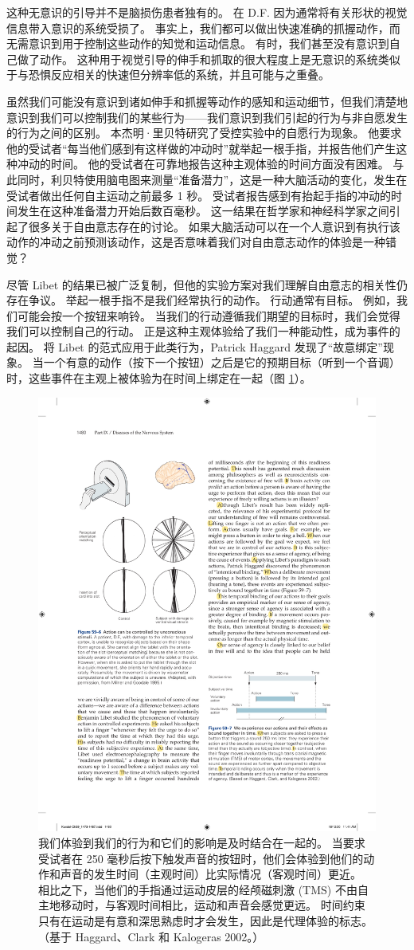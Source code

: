 这种无意识的引导并不是脑损伤患者独有的。 在 D.F. 因为通常将有关形状的视觉信息带入意识的系统受损了。 事实上，我们都可以做出快速准确的抓握动作，而无需意识到用于控制这些动作的知觉和运动信息。 有时，我们甚至没有意识到自己做了动作。 这种用于视觉引导的伸手和抓取的很大程度上是无意识的系统类似于与恐惧反应相关的快速但分辨率低的系统，并且可能与之重叠。

虽然我们可能没有意识到诸如伸手和抓握等动作的感知和运动细节，但我们清楚地意识到我们可以控制我们的某些行为——我们意识到我们引起的行为与非自愿发生的行为之间的区别。 本杰明·里贝特研究了受控实验中的自愿行为现象。 他要求他的受试者“每当他们感到有这样做的冲动时”就举起一根手指，并报告他们产生这种冲动的时间。 他的受试者在可靠地报告这种主观体验的时间方面没有困难。 与此同时，利贝特使用脑电图来测量“准备潜力”，这是一种大脑活动的变化，发生在受试者做出任何自主运动之前最多 1 秒。 受试者报告感到有抬起手指的冲动的时间发生在这种准备潜力开始后数百毫秒。 这一结果在哲学家和神经科学家之间引起了很多关于自由意志存在的讨论。 如果大脑活动可以在一个人意识到有执行该动作的冲动之前预测该动作，这是否意味着我们对自由意志动作的体验是一种错觉？

尽管 Libet 的结果已被广泛复制，但他的实验方案对我们理解自由意志的相关性仍存在争议。 举起一根手指不是我们经常执行的动作。 行动通常有目标。 例如，我们可能会按一个按钮来响铃。 当我们的行动遵循我们期望的目标时，我们会觉得我们可以控制自己的行动。 正是这种主观体验给了我们一种能动性，成为事件的起因。 将 Libet 的范式应用于此类行为，Patrick Haggard 发现了“故意绑定”现象。 当一个有意的动作（按下一个按钮）之后是它的预期目标（听到一个音调）时，这些事件在主观上被体验为在时间上绑定在一起（图 \ref{fig:59_7}）。

\begin{figure}[htbp]
	\centering
	\includegraphics[width=0.5\linewidth]{chap59/fig_59_7}
	\caption{我们体验到我们的行为和它们的影响是及时结合在一起的。 当要求受试者在 250 毫秒后按下触发声音的按钮时，他们会体验到他们的动作和声音的发生时间（主观时间）比实际情况（客观时间）更近。 相比之下，当他们的手指通过运动皮层的经颅磁刺激 (TMS) 不由自主地移动时，与客观时间相比，运动和声音会感觉更远。 时间约束只有在运动是有意和深思熟虑时才会发生，因此是代理体验的标志。 （基于 Haggard、Clark 和 Kalogeras 2002。）}
	\label{fig:59_7}
\end{figure}

